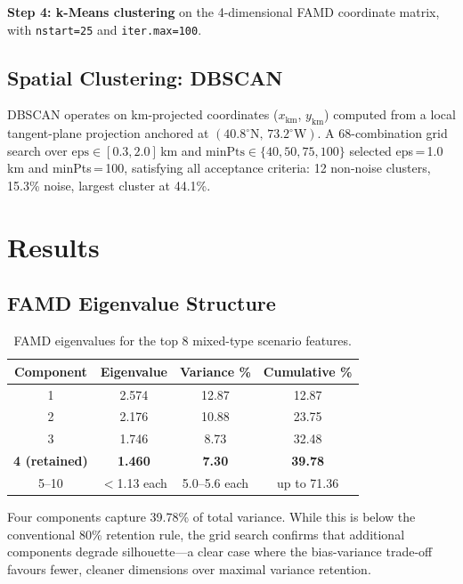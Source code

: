 \documentclass[11pt,letterpaper]{article}
\begin{document}
\textbf{Step 4: k-Means clustering} on the 4-dimensional FAMD coordinate matrix, with \texttt{nstart=25} and \texttt{iter.max=100}.

\subsection{Spatial Clustering: DBSCAN}

DBSCAN operates on km-projected coordinates ($x_\text{km}$, $y_\text{km}$) computed from a local tangent-plane projection anchored at $(40.8^\circ\text{N},\, 73.2^\circ\text{W})$. A 68-combination grid search over $\text{eps} \in [0.3, 2.0]$\,km and $\text{minPts} \in \{40, 50, 75, 100\}$ selected eps\,=\,1.0\,km and minPts\,=\,100, satisfying all acceptance criteria: 12 non-noise clusters, 15.3\% noise, largest cluster at 44.1\%.

\section{Results}

\subsection{FAMD Eigenvalue Structure}

\begin{table}[H]
\centering
\small
\caption{FAMD eigenvalues for the top 8 mixed-type scenario features.}
\begin{tabular}{@{}cccc@{}}
\toprule
\textbf{Component} & \textbf{Eigenvalue} & \textbf{Variance \%} & \textbf{Cumulative \%} \\
\midrule
1 & 2.574 & 12.87 & 12.87 \\
2 & 2.176 & 10.88 & 23.75 \\
3 & 1.746 & 8.73  & 32.48 \\
\textbf{4 (retained)} & \textbf{1.460} & \textbf{7.30} & \textbf{39.78} \\
5--10 & $<$1.13 each & 5.0--5.6 each & up to 71.36 \\
\bottomrule
\end{tabular}
\end{table}

Four components capture 39.78\% of total variance. While this is below the conventional 80\% retention rule, the grid search confirms that additional components degrade silhouette---a clear case where the bias-variance trade-off favours fewer, cleaner dimensions over maximal variance retention.
\end{document}
